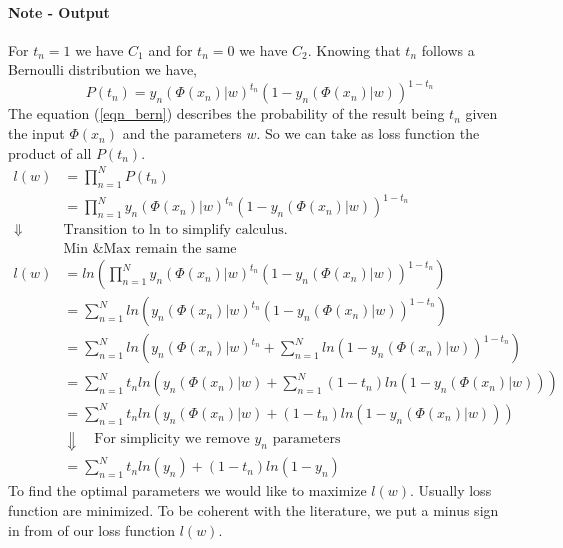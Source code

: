 \documentclass[../main.tex]{subfiles}
\begin{document}
\paragraph{Note - Output} For $t_n = 1$ we have $C_1$ and for $t_n = 0$ we have $C_2$.
\newline \newline
Knowing that $t_n$ follows a Bernoulli distribution we have,
\begin{equation}
    P(t_n) = y_n(\Phi(x_n)|w)^{t_n} (1 - y_n(\Phi(x_n)|w))^{1- t_n} \label{eqn_bern}
\end{equation}
The equation (\ref{eqn_bern}) describes the probability of the result being $t_n$ given the input $\Phi(x_n)$ and the parameters $w$. So we can take as loss function the product of all $P(t_n)$.
\begin{align*}
    l(w)             & = \prod_{n=1}^N P(t_n)                                                                      \\
                     & = \prod_{n=1}^N y_n(\Phi(x_n)|w)^{t_n} (1 - y_n(\Phi(x_n)|w))^{1- t_n}                      \\
    \Downarrow \quad & \text{Transition to ln to simplify calculus.}                                               \\
                     & \text{Min \& Max remain the same}                                                           \\
    l(w)             & = ln(\prod_{n=1}^N y_n(\Phi(x_n)|w)^{t_n} (1 - y_n(\Phi(x_n)|w))^{1- t_n})                  \\
                     & = \sum_{n=1}^N ln(y_n(\Phi(x_n)|w)^{t_n} (1 - y_n(\Phi(x_n)|w))^{1- t_n})                   \\
                     & = \sum_{n=1}^N ln(y_n(\Phi(x_n)|w)^{t_n} + \sum_{n=1}^N ln(1 - y_n (\Phi(x_n)|w))^{1- t_n}) \\
                     & = \sum_{n=1}^N t_n ln(y_n(\Phi(x_n)|w) + \sum_{n=1}^N (1 - t_n)ln(1 - y_n (\Phi(x_n)|w)))   \\
                     & = \sum_{n=1}^N t_n ln(y_n(\Phi(x_n)|w) + (1 - t_n)ln(1 - y_n (\Phi(x_n)|w)))                \\
                     & \Downarrow \quad \text{For simplicity we remove }y_n\text{ parameters}                      \\
                     & = \sum_{n=1}^N t_n ln(y_n) + (1 - t_n)ln(1 - y_n)
\end{align*}
To find the optimal parameters we would like to maximize $l(w)$. Usually loss function are minimized. To be coherent with the literature, we put a minus sign in from of our loss function $l(w)$.
\end{document}
